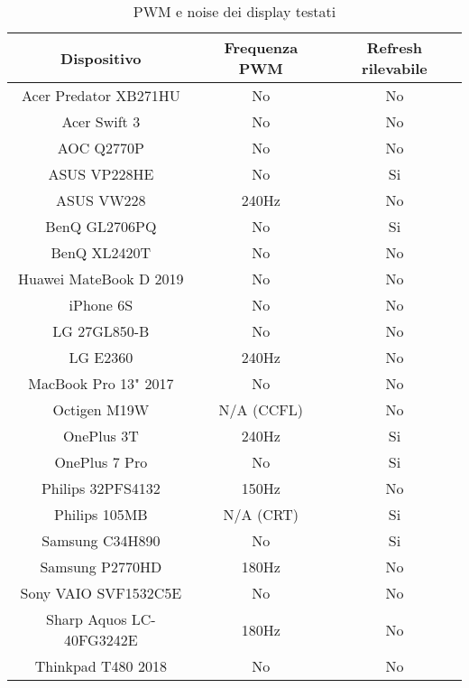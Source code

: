 \begin{table}[h!]
	\centering
	\begin{tabular}{|c|c|c|} 
		\hline
		\textbf{Dispositivo} & \textbf{Frequenza PWM} & \textbf{Refresh rilevabile}  \\ 
		\hline
		Acer Predator XB271HU & No & No \\ \hline
		Acer Swift 3 & No & No \\ \hline
		AOC Q2770P & No & No \\ \hline
		ASUS VP228HE & No & Si \\ \hline
		ASUS VW228 & 240Hz & No \\ \hline
		BenQ GL2706PQ & No & Si \\ \hline
		BenQ XL2420T & No & No \\ \hline
		Huawei MateBook D 2019 & No & No \\ \hline
		iPhone 6S & No & No \\ \hline
		LG 27GL850-B & No & No \\ \hline
		LG E2360 & 240Hz & No \\ \hline
		MacBook Pro 13" 2017 & No & No \\ \hline
		Octigen M19W & N/A (CCFL) & No \\ \hline
		OnePlus 3T & 240Hz & Si \\ \hline
		OnePlus 7 Pro & No & Si \\ \hline
		Philips 32PFS4132 & 150Hz & No \\ \hline
		Philips 105MB & N/A (CRT) & Si \\ \hline
		Samsung C34H890 & No & Si \\ \hline
		Samsung P2770HD & 180Hz & No \\ \hline
		Sony VAIO SVF1532C5E & No & No \\ \hline
		Sharp Aquos LC-40FG3242E & 180Hz & No \\ \hline
		Thinkpad T480 2018 & No & No \\ \hline
	\end{tabular}
	\caption{\label{tab:pwm_list}PWM e noise dei display testati}
\end{table}

